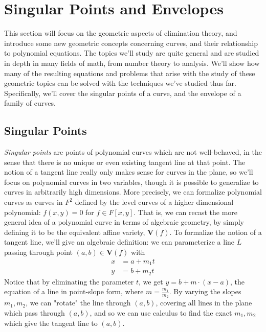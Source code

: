 \documentclass{article}
\begin{document}
\section{Singular Points and Envelopes}
This section will focus on the geometric aspects of elimination theory, and introduce some new geometric concepts concerning curves, and their relationship to polynomial equations. The topics we'll study are quite general and are studied in depth in many fields of math, from number theory to analysis. We'll show how many of the resulting equations and problems that arise with the study of these geometric topics can be solved with the techniques we've studied thus far. Specifically, we'll cover the singular points of a curve, and the envelope of a family of curves.

\subsection{Singular Points}
\textit{Singular points} are points of polynomial curves which are not well-behaved, in the sense that there is no unique or even existing tangent line at that point. The notion of a tangent line really only makes sense for curves in the plane, so we'll focus on polynomial curves in two variables, though it is possible to generalize to curves in arbitrarily high dimensions.
\newline
More precisely, we can formalize polynomial curves as curves in $ F^2 $ defined by the level curves of a higher dimensional polynomial: $ f(x, y) = 0 $ for $ f \in F[x, y] $. That is, we can recast the more general idea of a polynomial curve in terms of algebraic geometry, by simply defining it to be the equivalent affine variety, $ \mathbf{V}(f) $. To formalize the notion of a tangent line, we'll give an algebraic definition: we can parameterize a line $ L $ passing through point $ (a, b) \in \mathbf{V}(f) $ with
$$ \begin{aligned}
	x &= a + m_1 t \\
	y &= b + m_2 t
\end{aligned} $$
Notice that by eliminating the parameter $ t $, we get $ y = b + m \cdot (x - a) $, the equation of a line in point-slope form, where $ m = \frac{m_1}{m_2} $. By varying the slopes $ m_1, m_2 $, we can "rotate" the line through $ (a, b) $, covering all lines in the plane which pass through $ (a, b) $, and so we can use calculus to find the exact $ m_1, m_2 $ which give the tangent line to $ (a, b) $.
\newline
\end{document}
